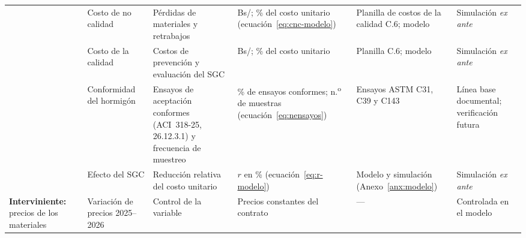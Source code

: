 \begin{landscape}
\begin{longtable}{@{}P{2.4cm}P{3.0cm}P{4.6cm}P{3.6cm}P{3.3cm}P{4.6cm}@{}}
& Costo de no calidad & Pérdidas de materiales y retrabajos & Bs/\mdos{}; \% del costo unitario (ecuación~\eqref{eq:cnc-modelo}) & Planilla de costos de la calidad C.6; modelo & Simulación \emph{ex ante} \\
& Costo de la calidad & Costos de prevención y evaluación del SGC & Bs/\mdos{}; \% del costo unitario & Planilla C.6; modelo & Simulación \emph{ex ante} \\
& Conformidad del hormigón & Ensayos de aceptación conformes (ACI~318-25, 26.12.3.1) y frecuencia de muestreo & \% de ensayos conformes; n.\textsuperscript{o} de muestras (ecuación~\eqref{eq:nensayos}) & Ensayos ASTM C31, C39 y C143 & Línea base documental; verificación futura \\
& Efecto del SGC & Reducción relativa del costo unitario & $r$ en \% (ecuación~\eqref{eq:r-modelo}) & Modelo y simulación (Anexo~\ref{anx:modelo}) & Simulación \emph{ex ante} \\
\midrule
\textbf{Interviniente:} precios de los materiales
& Variación de precios 2025--2026 & Control de la variable & Precios constantes del contrato & --- & Controlada en el modelo \\
\end{longtable}
\endgroup
{}
\end{landscape}



